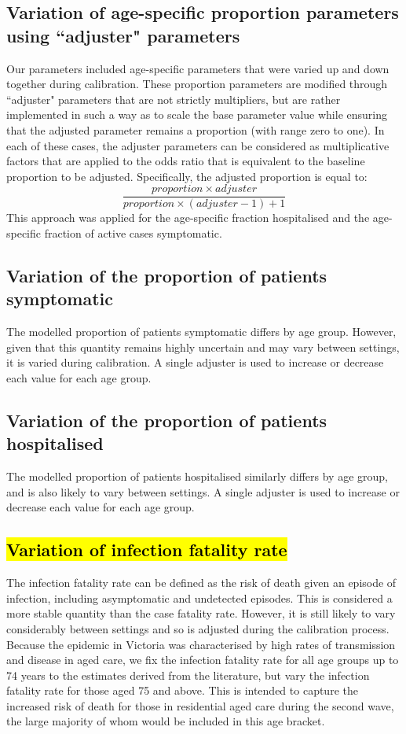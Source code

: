 \subsection{Variation of age-specific proportion parameters using ``adjuster" parameters}
Our parameters included age-specific parameters that were varied up and down together during calibration. These proportion parameters are modified through ``adjuster" parameters that are not strictly multipliers, but are rather implemented in such a way as to scale the base parameter value while ensuring that the adjusted parameter remains a proportion (with range zero to one). In each of these cases, the adjuster parameters can be considered as multiplicative factors that are applied to the odds ratio that is equivalent to the baseline proportion to be adjusted. Specifically, the adjusted proportion is equal to:
\[\frac{proportion \times adjuster}{proportion \times (adjuster-1)+1}\]
This approach was applied for the age-specific fraction hospitalised and the age-specific fraction of active cases symptomatic.

\subsection{Variation of the proportion of patients symptomatic}
The modelled proportion of patients symptomatic differs by age group. However, given that this quantity remains highly uncertain and may vary between settings, it is varied during calibration. A single adjuster is used to increase or decrease each value for each age group.

\subsection{Variation of the proportion of patients hospitalised}
The modelled proportion of patients hospitalised similarly differs by age group, and is also likely to vary between settings. A single adjuster is used to increase or decrease each value for each age group.

\subsection{\hl{Variation of infection fatality rate}}

The infection fatality rate can be defined as the risk of death given an episode of infection, including asymptomatic and undetected episodes. This is considered a more stable quantity than the case fatality rate. However, it is still likely to vary considerably between settings and so is adjusted during the calibration process. Because the epidemic in Victoria was characterised by high rates of transmission and disease in aged care, we fix the infection fatality rate for all age groups up to 74 years to the estimates derived from the literature, but vary the infection fatality rate for those aged 75 and above. This is intended to capture the increased risk of death for those in residential aged care during the second wave, the large majority of whom would be included in this age bracket.

